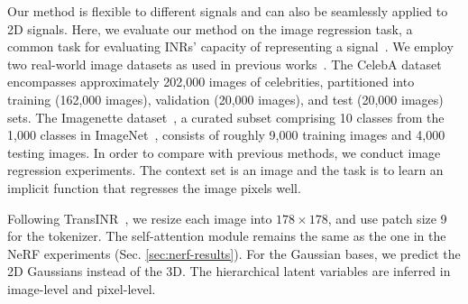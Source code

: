 Our method is flexible to different signals and can also be seamlessly applied to 2D signals. Here, we evaluate our method on the image regression task, a common task for evaluating INRs' capacity of representing a signal~\citep{tancik2021learned,sitzmann2020implicit}. 
We employ two real-world image datasets as used in previous works~\citep{chen2022transformers,tancik2021learned,gu2023generalizable}. The CelebA dataset~\citep{liu2015deep} encompasses approximately 202,000 images of celebrities, partitioned into training (162,000 images), validation (20,000 images), and test (20,000 images) sets. The Imagenette dataset~\citep{imagenette}, a curated subset comprising 10 classes from the 1,000 classes in ImageNet~\citep{deng2009imagenet}, consists of roughly 9,000 training images and 4,000 testing images. In order to compare with previous methods, we conduct image regression experiments. The context set is an image and the task is to learn an implicit function that regresses the image pixels well. %


Following TransINR~\citep{chen2022transformers}, we resize each image into $178\times 178$, and use patch size 9 for the tokenizer. The self-attention module remains the same as the one in the NeRF experiments (Sec. \ref{sec:nerf-results}). For the Gaussian bases, we predict the 2D Gaussians instead of the 3D. 
The hierarchical latent variables are inferred in image-level and pixel-level. 




